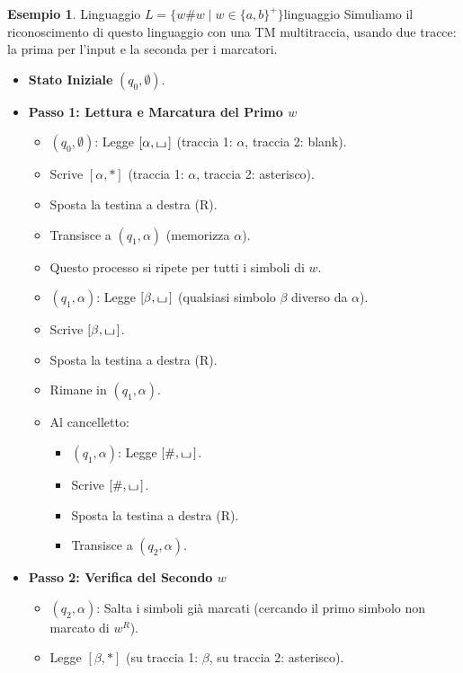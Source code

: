 \documentclass[a4paper]{article}
\theoremstyle{definition} %
\newtheorem{example}{Esempio}
\newcommand{\blankS}{\ensuremath{\raisebox{-0.15ex}{\scalebox{1.3}[0.7]{$\sqcup$}}\mkern2mu}}
\begin{document}
\begin{example}{Linguaggio $L = \{w\#w \mid w \in \{a,b\}^+\}$}{linguaggio}
Simuliamo il riconoscimento di questo linguaggio con una TM multitraccia, usando due tracce: la prima per l'input e la seconda per i marcatori.
\begin{itemize}
    \item \textbf{Stato Iniziale} $(q_0, \emptyset)$.
    \item \textbf{Passo 1: Lettura e Marcatura del Primo $w$}
        \begin{itemize}
            \item $(q_0, \emptyset)$: Legge $[\alpha, \blankS]$ (traccia 1: $\alpha$, traccia 2: blank).
            \item Scrive $[\alpha, *]$ (traccia 1: $\alpha$, traccia 2: asterisco).
            \item Sposta la testina a destra (R).
            \item Transisce a $(q_1, \alpha)$ (memorizza $\alpha$).
            \item Questo processo si ripete per tutti i simboli di $w$.
            \item $(q_1, \alpha)$: Legge $[\beta, \blankS]$ (qualsiasi simbolo $\beta$ diverso da $\alpha$).
            \item Scrive $[\beta, \blankS]$.
            \item Sposta la testina a destra (R).
            \item Rimane in $(q_1, \alpha)$.
            \item Al cancelletto:
                \begin{itemize}
                    \item $(q_1, \alpha)$: Legge $[\#, \blankS]$.
                    \item Scrive $[\#, \blankS]$.
                    \item Sposta la testina a destra (R).
                    \item Transisce a $(q_2, \alpha)$.
                \end{itemize}
        \end{itemize}
    \item \textbf{Passo 2: Verifica del Secondo $w$}
        \begin{itemize}
            \item $(q_2, \alpha)$: Salta i simboli già marcati (cercando il primo simbolo non marcato di $w^R$).
            \item Legge $[\beta, *]$ (su traccia 1: $\beta$, su traccia 2: asterisco).

\end{itemize}
\end{itemize}
\end{example}
\end{document}
